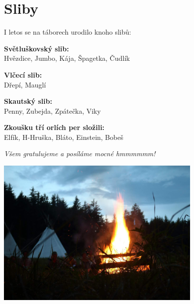 \chapter{Sliby} %
\label{cha:sliby}

I letos se na táborech urodilo knoho slibů:

\vspace{20pt}

\textbf{Světluškovský slib:}\\
Hvězdice, Jumbo, Kája, Špagetka, Čudlík

\textbf{Vlčecí slib:}\\
Dřepí, Mauglí

\textbf{Skautský slib:}\\
Penny, Zubejda, Zpátečka, Viky


\vspace{15pt}

\textbf{Zkoušku tří orlích per složili:}\\
Elfík, H-Hruška, Bláto, Einstein, Bobeš

\vspace{30pt}

\textit{Všem gratulujeme a posíláme mocné hmmmmmm!}

\vfil

\begin{center}

\includegraphics[width=10cm]{img/Slib_ohen.jpg}

\end{center}

\clearpage
